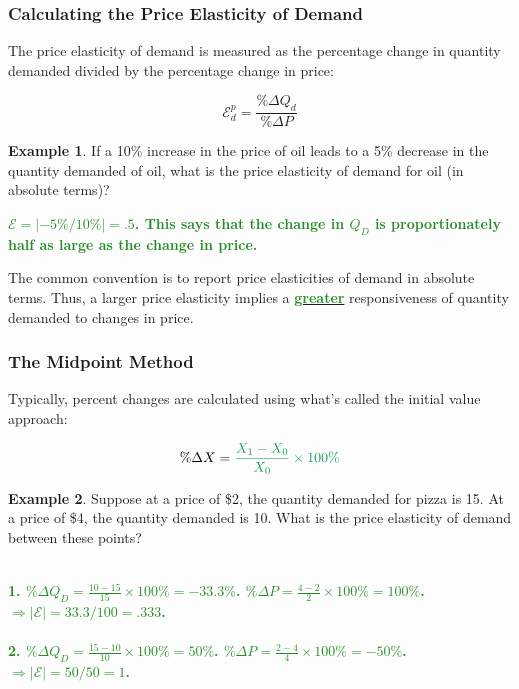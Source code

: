 \documentclass[11pt]{article}\usepackage[]{graphicx}\usepackage[]{color}
\theoremstyle{definition}
\newtheorem{exmp}{Example}[section]
\newcommand{\blank}[1]{}
\newcommand{\ddp}[1]{{\textbf{\textcolor{ForestGreen}{#1}}}}
\newcommand{\dd}[1]{{\underline{\textbf{\textcolor{ForestGreen}{#1}}}}}
\begin{document}
		\subsubsection*{Calculating the Price Elasticity of Demand}
		
		
		The price elasticity of demand is measured as the percentage change in quantity demanded divided by the percentage change in price:
		
		\begin{equation*}
		\mathcal{E}_d^p = \frac{\%\Delta Q_d}{\%\Delta P}
		\end{equation*}
		
		
		\begin{exmp} 
			If a 10\% increase in the price of oil leads to a 5\% decrease in the quantity demanded of oil, what is the price elasticity of demand for oil (in absolute terms)?
		\end{exmp}
		\ddp{$\mathcal{E} = |-5\%/10\%| = .5$. This says that the change in $Q_D$ is proportionately half as large as the change in price.}
		\vspace{1em}
		
		The common convention is to report price elasticities of demand in absolute terms. Thus, a larger price elasticity implies a \dd{greater} responsiveness of quantity demanded to changes in price.
		
		\subsubsection*{The Midpoint Method}
		
		
		Typically, percent changes are calculated using what's called the initial value approach:
		
		\begin{equation*}
		\%\Delta X = \ddp{$\frac{X_1 - X_0}{X_0} \times 100\%$}
		\end{equation*}
		
		\begin{exmp} 
			Suppose at a price of \$2, the quantity demanded for pizza is 15. At a price of \$4, the quantity demanded is 10. What is the price elasticity of demand between these points?
		\end{exmp}
		\blank{}
		\blank{}
		\ddp{\\1. $\%\Delta Q_D = \frac{10-15}{15} \times 100\% = -33.3\%$.
			$\%\Delta P = \frac{4-2}{2} \times 100\% = 100\%$. $\Rightarrow |\mathcal{E}| = 33.3/100 = .333$. \\ \\
			2. $\%\Delta Q_D = \frac{15-10}{10} \times 100\% = 50\%$.
			$\%\Delta P = \frac{2-4}{4} \times 100\% = -50\%$. $\Rightarrow |\mathcal{E}| = 50/50 = 1$. \\}
		
\end{document}
